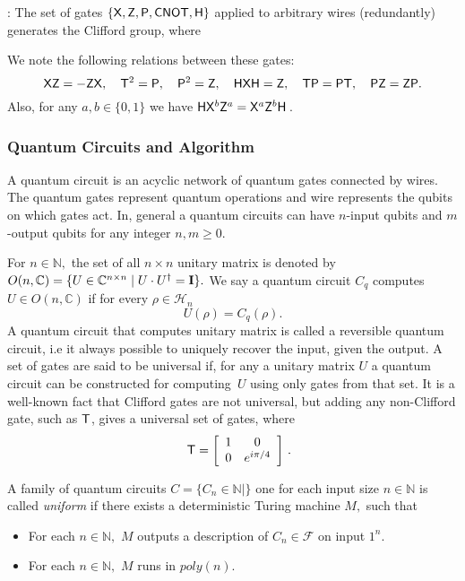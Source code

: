 \begin{definition}
\label{defn:Clifford+T:family}
 : The set of gates $\{{\sf X}, {\sf Z}, {\sf P}, {\sf CNOT},{\sf H}\}$ applied to arbitrary wires (redundantly) generates the Clifford group, where

We note the following relations between these gates:
$${\sf X}{\sf Z} = - {\sf Z}{\sf X},\quad {\sf T}^2={\sf P},\quad{\sf P}^2={\sf Z},\quad{\sf H}{\sf X}{\sf H}={\sf Z},\quad {\sf T}{\sf P}={\sf P}{\sf T},\quad{\sf P}{\sf Z}={\sf Z}{\sf P}.$$
Also, for any $a,b\in\{0,1\}$ we have
${\sf H}{\sf X}^b{\sf Z}^a={\sf X}^a{\sf Z}^b {\sf H}$\,.
\end{definition}

\subsubsection{Quantum Circuits and Algorithm}
A quantum circuit is an acyclic network of quantum gates connected by wires. The quantum gates represent quantum operations and wire represents the qubits on which gates act. In, general a quantum circuits can have $n$-input qubits and $m$-output qubits for any integer $n,m\geq 0.$

For $n\in \mathbb{N},$ the set of all $n\times n$ unitary matrix is denoted by $O(n,\mathbb{C})=\{U\in \mathbb{C}^{n\times n} \mid U\cdot U^\dagger={\bf I}\}.$ We say a quantum circuit $C_q$ computes $U\in O(n,\mathbb{C})$ if for every $\rho\in \mathcal{H}_n$
$$U(\rho )=C_q(\rho).$$
A quantum circuit that computes unitary matrix is called a reversible  quantum circuit, i.e it always possible to uniquely recover the input, given the output. A set of gates are said to be universal if, for any a unitary matrix $U$  a quantum circuit can be constructed for computing~$U$ using only gates from that set. It is a well-known fact that Clifford gates are not universal, but adding any non-Clifford gate, such as ${\sf T}$, gives a universal set of gates, where
$$\quad{\sf T} = \left[\begin{array}{cc} 1 & 0\\ 0 & e^{i\pi/4}\end{array}\right]\,.$$

A family of quantum circuits $C=\{C_n\in \mathbb{N} \mid \}$ one for each input  size $n\in \mathbb{N}$ is called \emph{uniform} if there exists a deterministic Turing machine $M,$ such that
 \begin{itemize}
 \item For each $n\in\mathbb{N},$ $M$ outputs a description of $C_n \in \mathcal{F}$ on input $1^n.$
 \item  For each $n\in\mathbb{N},$ $M$ runs in $poly(n).$
 \end{itemize}

